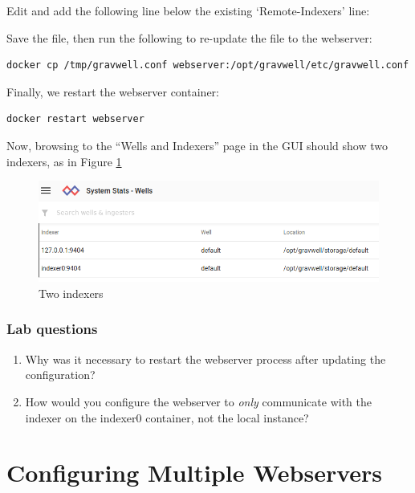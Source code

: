 Edit  and add the following line below the existing `Remote-Indexers' line:


Save the file, then run the following to re-update the file to the webserver:

\begin{Verbatim}[breaklines=true]
docker cp /tmp/gravwell.conf webserver:/opt/gravwell/etc/gravwell.conf
\end{Verbatim}

Finally, we restart the webserver container:

\begin{Verbatim}[breaklines=true]
docker restart webserver
\end{Verbatim}

Now, browsing to the ``Wells and Indexers'' page in the GUI should show
two indexers, as in Figure \ref{fig:twoindexers}

\begin{figure}
	\includegraphics{images/twoindexers.png}
	\caption{Two indexers}
	\label{fig:twoindexers}
\end{figure}

\subsubsection{Lab questions}

\begin{enumerate}
\item
  Why was it necessary to restart the webserver process after updating
  the configuration?
\item
  How would you configure the webserver to \emph{only} communicate with
  the indexer on the indexer0 container, not the local instance?
\end{enumerate}

\section{Configuring Multiple Webservers}

